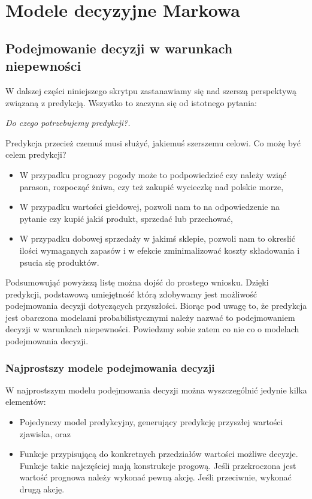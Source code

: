 \documentclass[10pt,a4paper]{book}
\begin{document}
\chapter{Modele decyzyjne Markowa}

\section{Podejmowanie decyzji w warunkach niepewności}

W dalszej części niniejszego skrytpu zastanawiamy się nad szerszą perspektywą związaną z predykcją. Wszystko to zaczyna się od istotnego pytania:

\textit{Do czego potrzebujemy predykcji?.}

Predykcja przecież czemuś musi służyć, jakiemuś szerszemu celowi.
Co możę być celem predykcji?

\begin{itemize}
\item W przypadku prognozy pogody może to podpowiedzieć czy należy wziąć parason, rozpocząć żniwa, czy też zakupić wycieczkę nad polskie morze,
\item W przypadku wartości giełdowej, pozwoli nam to na odpowiedzenie na pytanie czy kupić jakiś produkt, sprzedać lub przechować,
\item W przypadku dobowej sprzedaży w jakimś sklepie, pozwoli nam to okreslić ilości wymaganych zapasów i w efekcie zminimalizować koszty składowania i psucia się produktów. 
\end{itemize}

Podsumowująć powyższą listę można dojść do prostego wniosku. Dzięki predykcji, podstawową umiejętność którą zdobywamy jest możliwość podejmowania decyzji dotyczących przyszłości. Biorąc pod uwagę to, że predykcja jest obarczona modelami probabilistycznymi należy nazwać to podejmowaniem decyzji w warunkach niepewności. Powiedzmy sobie zatem co nie co o modelach podejmowania decyzji.

\subsection{Najprostszy modele podejmowania decyzji}

W najprostszym modelu podejmowania decyzji można wyszczególnić jedynie kilka elementów:
\begin{itemize}
\item Pojedynczy model predykcyjny, generujący predykcję przyszłej wartości zjawiska, oraz
\item Funkcje przypisującą do konkretnych przedziałów wartości możliwe decyzje. Funkcje takie najczęściej mają konstrukcje progową. Jeśli przekroczona jest wartość prognowa należy wykonać pewną akcję. Jeśli przeciwnie, wykonać drugą akcję. 
\end{itemize}
\end{document}
